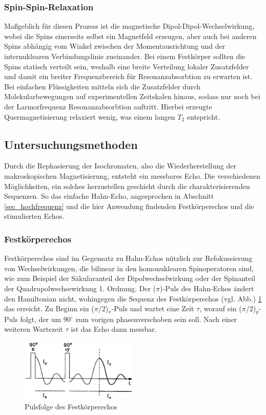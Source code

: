 \subsubsection{Spin-Spin-Relaxation}
Maßgeblich für diesen Prozess ist die magnetische Dipol-Dipol-Wechselwirkung, wobei die Spins einerseits selbst ein Magnetfeld erzeugen, aber auch bei anderen
Spins abhängig vom Winkel zwischen der Momentausrichtung und der internuklearen Verbindungslinie zueinander. Bei einem Festkörper sollten die Spins statisch 
verteilt sein, weshalb eine breite Verteilung lokaler Zusatzfelder und damit ein breiter Frequenzbereich für Resonanzabsorbtion zu erwarten ist. Bei
einfachen Flüssigkeiten mitteln sich die Zusatzfelder durch Molekularbewegungen auf experimentellen Zeitskalen hinaus, sodass nur noch bei der Larmorfrequenz
Resonanzabsorbtion auftritt. Hierbei erzeugte Quermagnetisierung relaxiert wenig, was einem langen $T_2$ entspricht.

\subsection{Untersuchungsmethoden}
Durch die Rephasierung der Isochromaten, also die Wiederherstellung der makroskopischen Magnetisierung, entsteht ein messbares Echo. Die verschiedenen 
Möglichkeiten, ein solches herzustellen geschieht durch die charakterisierenden Sequenzen. So das einfache Hahn-Echo, angesprochen in Abschnitt 
\ref{sec_hochfrequenz} und die hier Anwendung findenden Festkörperechos und die stimulierten Echos.
\subsubsection{Festkörperechos}
Festkörperechos sind im Gegensatz zu Hahn-Echos nützlich zur Refokussierung von Wechselwirkungen, die bilinear in den homonuklearen Spinoperatoren sind, wie
zum Beispiel der Säkularanteil der Dipolwechselwirkung oder der Spinanteil der Quadrupolwechsewirkung 1. Ordnung. Der ($\pi$)-Puls des Hahn-Echos ändert den
Hamiltonian nicht, wohingegen die Sequenz des Festkörperechos (vgl. Abb.) \ref{pic_festEchoFolge} das erreicht. Zu Beginn ein ($\pi/2$)$_x$-Puls und wartet
eine Zeit $\tau$, worauf ein ($\pi/2$)$_y$-Puls folgt, der um 90$^\circ$ zum vorigen phasenverschoben sein soll. Nach einer weiteren Wartezeit $\tau$ ist das
Echo dann messbar. 
\begin{figure}[htbp]
 \includegraphics[width=0.5\textwidth]{../pics/festEchoFolge.jpg}
 \caption{Pulsfolge des Festkörperechos}
 \label{pic_festEchoFolge}
\end{figure}
\noindent

